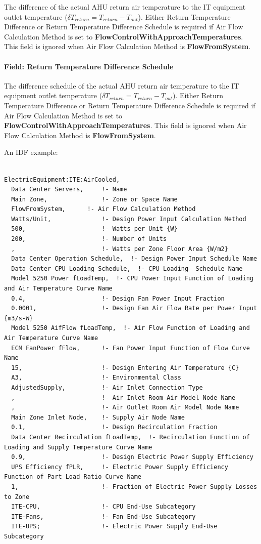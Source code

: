 The difference of the actual AHU return air temperature to the IT equipment outlet temperature ($\delta T_{return} = T_{return}-T_{out}$). Either Return Temperature Difference or Return Temperature Difference Schedule is required if Air Flow Calculation Method is set to \textbf{FlowControlWithApproachTemperatures}. This field is ignored when Air Flow Calculation Method is \textbf{FlowFromSystem}.

\paragraph{Field: Return Temperature Difference Schedule}\label{field-return-temperature-difference-schedule}

The difference schedule of the actual AHU return air temperature to the IT equipment outlet temperature ($\delta T_{return} = T_{return}-T_{out}$). Either Return Temperature Difference or Return Temperature Difference Schedule is required if Air Flow Calculation Method is set to \textbf{FlowControlWithApproachTemperatures}. This field is ignored when Air Flow Calculation Method is \textbf{FlowFromSystem}.

An IDF example:

\begin{lstlisting}

ElectricEquipment:ITE:AirCooled,
  Data Center Servers,     !- Name
  Main Zone,               !- Zone or Space Name
  FlowFromSystem,      !- Air Flow Calculation Method
  Watts/Unit,              !- Design Power Input Calculation Method
  500,                     !- Watts per Unit {W}
  200,                     !- Number of Units
  ,                        !- Watts per Zone Floor Area {W/m2}
  Data Center Operation Schedule,  !- Design Power Input Schedule Name
  Data Center CPU Loading Schedule,  !- CPU Loading  Schedule Name
  Model 5250 Power fLoadTemp,  !- CPU Power Input Function of Loading and Air Temperature Curve Name
  0.4,                     !- Design Fan Power Input Fraction
  0.0001,                  !- Design Fan Air Flow Rate per Power Input {m3/s-W}
  Model 5250 AifFlow fLoadTemp,  !- Air Flow Function of Loading and Air Temperature Curve Name
  ECM FanPower fFlow,      !- Fan Power Input Function of Flow Curve Name
  15,                      !- Design Entering Air Temperature {C}
  A3,                      !- Environmental Class
  AdjustedSupply,          !- Air Inlet Connection Type
  ,                        !- Air Inlet Room Air Model Node Name
  ,                        !- Air Outlet Room Air Model Node Name
  Main Zone Inlet Node,    !- Supply Air Node Name
  0.1,                     !- Design Recirculation Fraction
  Data Center Recirculation fLoadTemp,  !- Recirculation Function of Loading and Supply Temperature Curve Name
  0.9,                     !- Design Electric Power Supply Efficiency
  UPS Efficiency fPLR,     !- Electric Power Supply Efficiency Function of Part Load Ratio Curve Name
  1,                       !- Fraction of Electric Power Supply Losses to Zone
  ITE-CPU,                 !- CPU End-Use Subcategory
  ITE-Fans,                !- Fan End-Use Subcategory
  ITE-UPS;                 !- Electric Power Supply End-Use Subcategory
\end{lstlisting}

